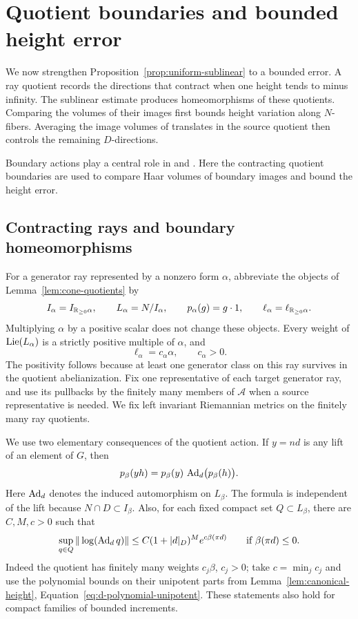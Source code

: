 \section{Quotient boundaries and bounded height error}
\label{sec:boundary}

We now strengthen Proposition~\ref{prop:uniform-sublinear} to a bounded
error.  A ray quotient records the directions that contract when one
height tends to minus infinity.  The sublinear estimate produces
homeomorphisms of these quotients.  Comparing the volumes of their
images first bounds height variation along $N$-fibers.  Averaging the
image volumes of translates in the source quotient then controls the
remaining $D$-directions.

Boundary actions play a central role in \cite[Theorem~2 and Section~4]{Dymarz2010} and
\cite[Section~4.1]{DymarzFisherXie2025}.  Here the contracting quotient
boundaries are used to compare Haar volumes of boundary images and
bound the height error.

\subsection{Contracting rays and boundary homeomorphisms}

For a generator ray represented by a nonzero form $\alpha$, abbreviate
the objects of Lemma~\ref{lem:cone-quotients} by
\[
 I_\alpha=I_{\mathbb R_{\ge0}\alpha},\qquad
 L_\alpha=N/I_\alpha,\qquad p_\alpha(g)=g\cdot1,\qquad
 \ell_\alpha=\ell_{\mathbb R_{\ge0}\alpha}.
\]
Multiplying $\alpha$ by a positive scalar does not change these
objects.  Every weight of $\operatorname{Lie}(L_\alpha)$ is a strictly positive
multiple of $\alpha$, and
\begin{equation}
\label{eq:ray-trace}
 \ell_\alpha=c_\alpha\alpha,\qquad c_\alpha>0.
\end{equation}
The positivity follows because at least one generator class on this
ray survives in the quotient abelianization.
Fix one representative of each target generator ray, and use its
pullbacks by the finitely many members of $\mathcal A$ when a source
representative is needed.  We fix left invariant Riemannian metrics
on the finitely many ray quotients.

We use two elementary consequences of the quotient action.
If $y=nd$ is any lift of an element of $G$, then
\begin{equation}
\label{eq:quotient-step}
 p_\beta(yh)=p_\beta(y)\,
     \operatorname{Ad}_d\bigl(p_\beta(h)\bigr).
\end{equation}
Here $\operatorname{Ad}_d$ denotes the induced automorphism on $L_\beta$.
The formula is independent of the lift because $N\cap D\subset I_\beta$.
Also, for each fixed compact set $Q\subset L_\beta$, there are
$C,M,c>0$ such that
\begin{equation}
\label{eq:quotient-contraction}
 \sup_{q\in Q}\|\log(\operatorname{Ad}_d q)\|
 \le C(1+|d|_D)^M e^{c\beta(\pi d)}
 \qquad\text{if }\beta(\pi d)\le0.
\end{equation}
Indeed the quotient has finitely many weights $c_j\beta$, $c_j>0$;
take $c=\min_jc_j$ and use the polynomial bounds on their unipotent
parts from Lemma~\ref{lem:canonical-height},
Equation~\eqref{eq:d-polynomial-unipotent}.  These statements also hold
for compact families of bounded increments.

